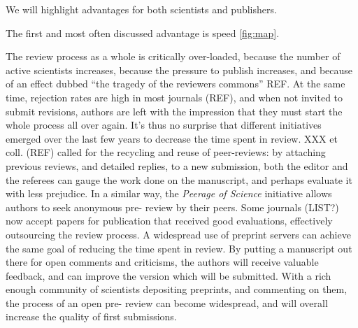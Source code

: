 \documentclass[letterpaper,twocolumn,superscriptaddress,showkeys]{revtex4}
\begin{document}
We will highlight advantages for both scientists and publishers.

The first and most often discussed advantage is speed \ref{fig:map}.



The review process as a whole is critically over-loaded, because the
number of active scientists increases, because the pressure to publish
increases, and because of an effect dubbed ``the tragedy of the
reviewers commons'' REF.  At the same time, rejection rates are high
in most journals (REF), and when not invited to submit revisions,
authors are left with the impression that they must start the whole
process all over again. It's thus no surprise that different
initiatives emerged over the last few years to decrease the time spent
in review. XXX et coll. (REF) called for the recycling and reuse of
peer-reviews: by attaching previous reviews, and detailed replies, to
a new submission, both the editor and the referees can gauge the work
done on the manuscript, and perhaps evaluate it with less
prejudice. In a similar way, the \emph{Peerage of Science} initiative
allows authors to seek anonymous pre- review by their peers. Some
journals (LIST?) now accept papers for publication that received good
evaluations, effectively outsourcing the review process. A widespread
use of preprint servers can achieve the same goal of reducing the time
spent in review. By putting a manuscript out there for open comments
and criticisms, the authors will receive valuable feedback, and can
improve the version which will be submitted. With a rich enough
community of scientists depositing preprints, and commenting on them,
the process of an open pre- review can become widespread, and will
overall increase the quality of first submissions.
\end{document}
